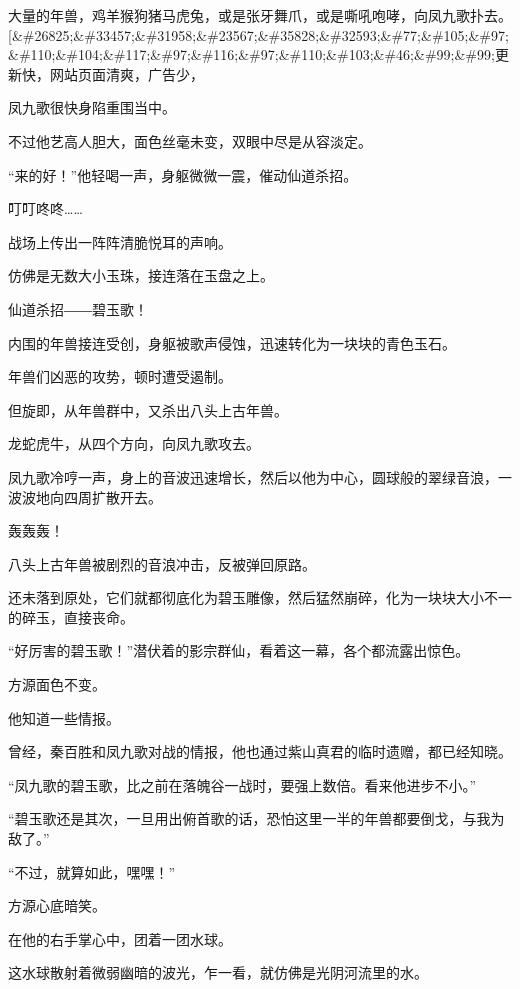 
\begin{this_body}

大量的年兽，鸡羊猴狗猪马虎兔，或是张牙舞爪，或是嘶吼咆哮，向凤九歌扑去。[\&\#26825;\&\#33457;\&\#31958;\&\#23567;\&\#35828;\&\#32593;\&\#77;\&\#105;\&\#97;\&\#110;\&\#104;\&\#117;\&\#97;\&\#116;\&\#97;\&\#110;\&\#103;\&\#46;\&\#99;\&\#99;更新快，网站页面清爽，广告少，

凤九歌很快身陷重围当中。

不过他艺高人胆大，面色丝毫未变，双眼中尽是从容淡定。

“来的好！”他轻喝一声，身躯微微一震，催动仙道杀招。

叮叮咚咚……

战场上传出一阵阵清脆悦耳的声响。

仿佛是无数大小玉珠，接连落在玉盘之上。

仙道杀招――碧玉歌！

内围的年兽接连受创，身躯被歌声侵蚀，迅速转化为一块块的青色玉石。

年兽们凶恶的攻势，顿时遭受遏制。

但旋即，从年兽群中，又杀出八头上古年兽。

龙蛇虎牛，从四个方向，向凤九歌攻去。

凤九歌冷哼一声，身上的音波迅速增长，然后以他为中心，圆球般的翠绿音浪，一波波地向四周扩散开去。

轰轰轰！

八头上古年兽被剧烈的音浪冲击，反被弹回原路。

还未落到原处，它们就都彻底化为碧玉雕像，然后猛然崩碎，化为一块块大小不一的碎玉，直接丧命。

“好厉害的碧玉歌！”潜伏着的影宗群仙，看着这一幕，各个都流露出惊色。

方源面色不变。

他知道一些情报。

曾经，秦百胜和凤九歌对战的情报，他也通过紫山真君的临时遗赠，都已经知晓。

“凤九歌的碧玉歌，比之前在落魄谷一战时，要强上数倍。看来他进步不小。”

“碧玉歌还是其次，一旦用出俯首歌的话，恐怕这里一半的年兽都要倒戈，与我为敌了。”

“不过，就算如此，嘿嘿！”

方源心底暗笑。

在他的右手掌心中，团着一团水球。

这水球散射着微弱幽暗的波光，乍一看，就仿佛是光阴河流里的水。


\end{this_body}
